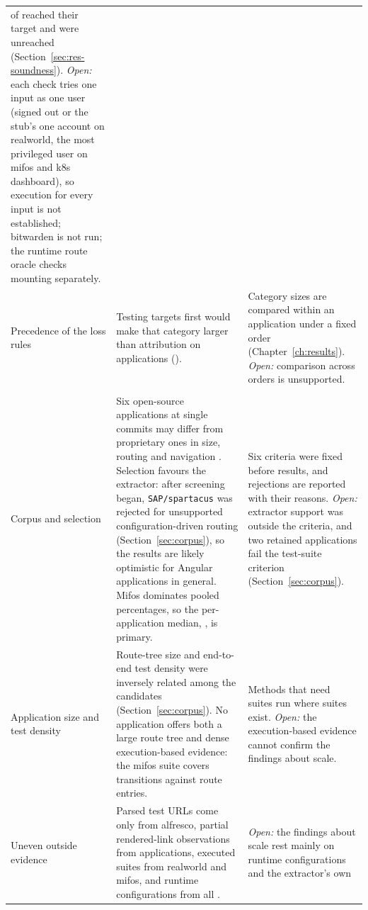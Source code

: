 \begin{xltabular}{\textwidth}{@{}>{\raggedright\arraybackslash}p{2.4cm}YY@{}}
\MustRunAddKdashConfirmed{} of \MustRunAddKdashTriggered{} reached their target and
\MustRunAddKdashUnreached{} were unreached (Section~\ref{sec:res-soundness}). \emph{Open:} each
check tries one input as one user (signed out or the stub's one account on realworld, the most privileged user on mifos and k8s dashboard), so execution for every input is not established;
bitwarden is not run; the runtime route oracle checks mounting separately. \\
Precedence of the loss rules
& Testing targets first would make that category larger than attribution on \AttrOrderFlips{}
applications (\AttrOrderFlipWhere{}).
& Category sizes are compared within an application under a fixed order (Chapter~\ref{ch:results}).
\emph{Open:} comparison across orders is unsupported. \\
\addlinespace[2pt]
\\
\addlinespace[2pt]
Corpus and selection
& Six open-source applications at single commits may differ from proprietary ones in size, routing
and navigation \cite{kalliamvakou2014promises,kalliamvakou2016indepth}. Selection favours the extractor:
after screening began, \texttt{SAP/spartacus} was rejected for unsupported configuration-driven
routing (Section~\ref{sec:corpus}), so the results are likely optimistic for Angular applications in general. Mifos dominates pooled
percentages, so the per-application median, \AttrRecoveredMedian{}, is primary.
& Six criteria were fixed before results, and rejections are reported with their reasons.
\emph{Open:} extractor support was outside the criteria, and two retained applications fail the
test-suite criterion (Section~\ref{sec:corpus}). \\
Application size and test density
& Route-tree size and end-to-end test density were inversely related among the candidates
(Section~\ref{sec:corpus}). No application offers both a large route tree and dense execution-based
evidence: the mifos suite covers \EtoEMifosPairs{} transitions against \RoundTwoRoutesMifos{}
route entries.
& Methods that need suites run where suites exist. \emph{Open:} the execution-based evidence cannot
confirm the findings about scale. \\
Uneven outside evidence
& Parsed test URLs come only from alfresco, partial rendered-link observations from \ScopeApps{} applications, executed suites from realworld and mifos, and runtime configurations from all
\ProbeApps{}.
& \emph{Open:} the findings about scale rest mainly on runtime configurations and the extractor's own

\end{xltabular}
